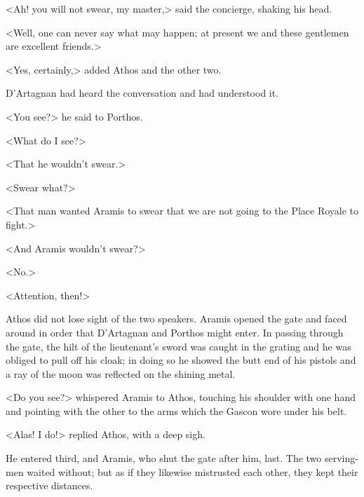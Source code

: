 <Ah! you will not swear, my master,> said the concierge, shaking his head.

<Well, one can never say what may happen; at present we and these gentlemen are excellent friends.>

<Yes, certainly,> added Athos and the other two.

D'Artagnan had heard the conversation and had understood it.

<You see?> he said to Porthos.

<What do I see?>

<That he wouldn't swear.>

<Swear what?>

<That man wanted Aramis to swear that we are not going to the Place Royale to fight.>

<And Aramis wouldn't swear?>

<No.>

<Attention, then!>

Athos did not lose sight of the two speakers. Aramis opened the gate and faced around in order that D'Artagnan and Porthos might enter. In passing through the gate, the hilt of the lieutenant's sword was caught in the grating and he was obliged to pull off his cloak; in doing so he showed the butt end of his pistols and a ray of the moon was reflected on the shining metal.

<Do you see?> whispered Aramis to Athos, touching his shoulder with one hand and pointing with the other to the arms which the Gascon wore under his belt.

<Alas! I do!> replied Athos, with a deep sigh.

He entered third, and Aramis, who shut the gate after him, last. The two serving-men waited without; but as if they likewise mistrusted each other, they kept their respective distances. 